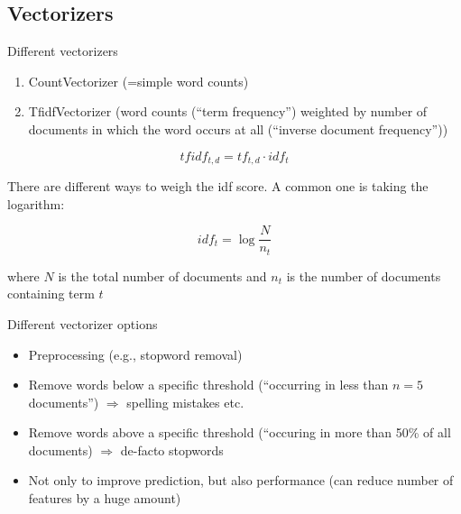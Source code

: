 \documentclass[compress]{beamer}
\begin{document}
\subsection{Vectorizers}

\begin{frame}{Different vectorizers}
	\begin{enumerate}[<+->]
		\item CountVectorizer (=simple word counts)
		\item TfidfVectorizer (word counts (``term frequency'') weighted by number of documents in which the word occurs at all (``inverse document frequency''))
	\end{enumerate}
	
	\pause
	$$tfidf_{t,d} = tf_{t,d} \cdot idf_{t}$$
	
	There are different ways to weigh the idf score. A common one is taking the logarithm:
	
	$$idf_{t} = \log \frac{N}{n_t}$$
	
	where $N$ is the total number of documents and $n_t$ is the number of documents containing term $t$
\end{frame}

\begin{frame}{Different vectorizer options}
	\begin{itemize}
		\item Preprocessing (e.g., stopword removal)
		\item Remove words below a specific threshold (``occurring in less than $n=5$ documents'') $\Rightarrow$ spelling mistakes etc.
		\item Remove words above a specific threshold (``occuring in more than 50\% of all documents) $\Rightarrow$ de-facto stopwords
		\item Not only to improve prediction, but also performance (can reduce number of features by a huge amount)
	\end{itemize}
\end{frame}
\end{document}
